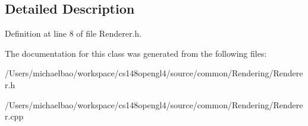 \subsection{Detailed Description}


Definition at line 8 of file Renderer.\+h.



The documentation for this class was generated from the following files\+:\begin{DoxyCompactItemize}
\item 
/\+Users/michaelbao/workspace/cs148opengl4/source/common/\+Rendering/Renderer.\+h\item 
/\+Users/michaelbao/workspace/cs148opengl4/source/common/\+Rendering/Renderer.\+cpp\end{DoxyCompactItemize}
